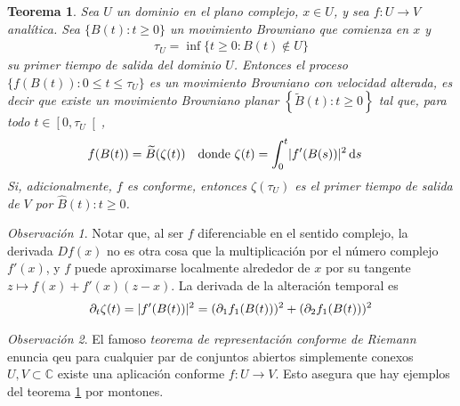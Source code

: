 \documentclass{article}
\newcommand{\dd}{\mathop{}\!\mathrm{d}}
\newcommand{\complexNumbers}{\mathbb{C}}
\DeclarePairedDelimiter{\abs}{\lvert}{\rvert}
\theoremstyle{plain}
\newtheorem{theorem}{Teorema}
\theoremstyle{remark}
\newtheorem{remark}{Observación}
\begin{document}
\begin{theorem}
  \label{theorem:ConformalInvarianceOfPlanarBrownianMotion}
  Sea \(U\) un dominio en el plano complejo, \(x \in U\), y sea \(f : U \rightarrow V\) analítica.
  Sea \(\{B(t) : t \geq 0\}\) un movimiento Browniano que comienza en \(x\) y
  \begin{align}
    \tau_U
    =
    \inf \{ t \geq 0 : B(t) \notin U\}
  \end{align}
  su primer tiempo de salida del dominio \(U\).
  Entonces el proceso \(\{f(B(t)) : 0 \leq t \leq \tau_U\}\) es un movimiento Browniano con velocidad alterada, es decir que existe un movimiento Browniano planar \(\left\{ \widetilde{B}(t) : t \geq 0 \right\}\) tal que, para todo \(t \in \left[ 0, \tau_U \right[\),
  \begin{align}
    & f(B(t)) = \widetilde{B}(\zeta(t))
    &
    & \text{donde }
    \zeta(t) = \int_0^t \abs{f'(B(s))}^2 \dd s
  \end{align}
  Si, adicionalmente, \(f\) es conforme, entonces \(\zeta(\tau_U)\) es el primer tiempo de salida de \(V\) por \(\widehat{B}(t) : t \geq 0\).
\end{theorem}
\begin{remark}
  Notar que, al ser \(f\) diferenciable en el sentido complejo, la derivada \(Df(x)\) no es otra cosa que la multiplicación por el número complejo \(f'(x)\), y \(f\) puede aproximarse localmente alrededor de \(x\) por su tangente \(z \mapsto f(x) + f'(x)(z - x)\).
  La derivada de la alteración temporal es
  \begin{align}
    \partial_t \zeta(t)
    =
    \abs{f'(B(t))}^2
    =
    (\partial_1 f_1(B(t)))^2 + (\partial_2 f_1(B(t)))^2
  \end{align}
\end{remark}
\begin{remark}
  El famoso \emph{teorema de representación conforme de Riemann} enuncia qeu para cualquier par de conjuntos abiertos simplemente conexos \(U, V \subset \complexNumbers\) existe una aplicación conforme \(f : U \rightarrow V\).
  Esto asegura que hay ejemplos del teorema \ref{theorem:ConformalInvarianceOfPlanarBrownianMotion} por montones.
\end{remark}
\end{document}
